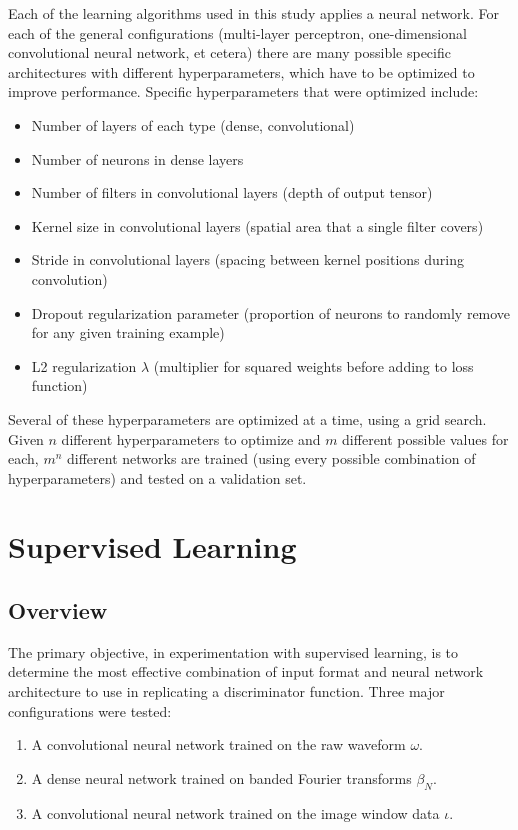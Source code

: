\documentclass[10pt]{article}
\begin{document}
Each of the learning algorithms used in this study applies a neural network. For each of the general configurations (multi-layer perceptron, one-dimensional convolutional neural network, et cetera) there are many possible specific architectures with different hyperparameters, which have to be optimized to improve performance. Specific hyperparameters that were optimized include:

\begin{itemize}
    \item Number of layers of each type (dense, convolutional)
    \item Number of neurons in dense layers
    \item Number of filters in convolutional layers (depth of output tensor)
    \item Kernel size in convolutional layers (spatial area that a single filter covers)
    \item Stride in convolutional layers (spacing between kernel positions during convolution)
    \item Dropout regularization parameter (proportion of neurons to randomly remove for any given training example)
    \item L2 regularization $\lambda$ (multiplier for squared weights before adding to loss function)
\end{itemize}

Several of these hyperparameters are optimized at a time, using a grid search. Given $n$ different hyperparameters to optimize and $m$ different possible values for each, $m^n$ different networks are trained (using every possible combination of hyperparameters) and tested on a validation set.

\section{Supervised Learning}

\subsection{Overview}

The primary objective, in experimentation with supervised learning, is to determine the most effective combination of input format and neural network architecture to use in replicating a discriminator function. Three major configurations were tested:

\begin{enumerate}
    \item A convolutional neural network trained on the raw waveform $\omega$.
    \item A dense neural network trained on banded Fourier transforms $\beta_{N}$.
    \item A convolutional neural network trained on the image window data $\iota$.
\end{enumerate}
\end{document}
